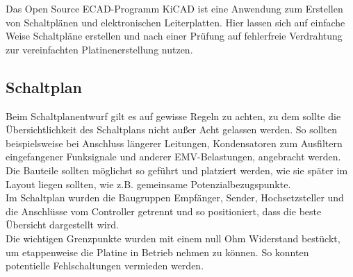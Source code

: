 
Das Open Source ECAD-Programm KiCAD ist eine Anwendung zum Erstellen von Schaltplänen und elektronischen Leiterplatten. Hier lassen sich auf einfache Weise Schaltpläne erstellen und nach einer Prüfung auf fehlerfreie Verdrahtung zur vereinfachten Platinenerstellung nutzen. 

\subsection{Schaltplan}
Beim Schaltplanentwurf gilt es auf gewisse Regeln zu achten, zu dem sollte die Übersichtlichkeit des Schaltplans nicht außer Acht gelassen werden.
So sollten beispielsweise bei Anschluss längerer Leitungen, Kondensatoren zum Ausfiltern eingefangener Funksignale und anderer EMV-Belastungen, angebracht werden. Die Bauteile sollten möglichst so geführt und platziert werden, wie sie später im Layout liegen sollten, wie z.B. gemeinsame Potenzialbezugspunkte.\\
Im Schaltplan wurden die Baugruppen Empfänger, Sender, Hochsetzsteller und die Anschlüsse vom Controller getrennt und so positioniert, dass die beste Übersicht dargestellt wird.\\
Die wichtigen Grenzpunkte wurden mit einem null Ohm Widerstand bestückt, um etappenweise die Platine in Betrieb nehmen zu können. So konnten potentielle Fehlschaltungen vermieden werden.\\

